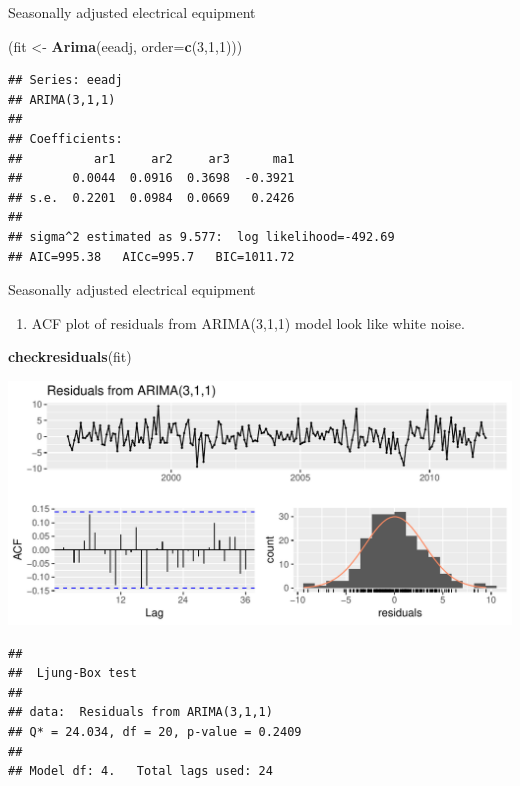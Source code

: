 \documentclass[14pt,ignorenonframetext,]{beamer}
\newenvironment{Shaded}{\begin{snugshade}}{\end{snugshade}}
\newcommand{\KeywordTok}[1]{\textcolor[rgb]{0.13,0.29,0.53}{\textbf{#1}}}
\newcommand{\DataTypeTok}[1]{\textcolor[rgb]{0.13,0.29,0.53}{#1}}
\newcommand{\DecValTok}[1]{\textcolor[rgb]{0.00,0.00,0.81}{#1}}
\newcommand{\StringTok}[1]{\textcolor[rgb]{0.31,0.60,0.02}{#1}}
\newcommand{\NormalTok}[1]{#1}
\providecommand{\tightlist}{%
  \setlength{\itemsep}{0pt}\setlength{\parskip}{0pt}}
\begin{document}
\begin{frame}[fragile]{\large Seasonally adjusted electrical equipment}

\fontsize{10}{10}\sf

\begin{Shaded}
\begin{Highlighting}[]
\NormalTok{(fit <-}\StringTok{ }\KeywordTok{Arima}\NormalTok{(eeadj, }\DataTypeTok{order=}\KeywordTok{c}\NormalTok{(}\DecValTok{3}\NormalTok{,}\DecValTok{1}\NormalTok{,}\DecValTok{1}\NormalTok{)))}
\end{Highlighting}
\end{Shaded}

\begin{verbatim}
## Series: eeadj 
## ARIMA(3,1,1) 
## 
## Coefficients:
##          ar1     ar2     ar3      ma1
##       0.0044  0.0916  0.3698  -0.3921
## s.e.  0.2201  0.0984  0.0669   0.2426
## 
## sigma^2 estimated as 9.577:  log likelihood=-492.69
## AIC=995.38   AICc=995.7   BIC=1011.72
\end{verbatim}

\end{frame}

\begin{frame}[fragile]{\large Seasonally adjusted electrical equipment}

\begin{enumerate}
\def\labelenumi{\arabic{enumi}.}
\setcounter{enumi}{5}
\tightlist
\item
  ACF plot of residuals from ARIMA(3,1,1) model look like white noise.
\end{enumerate}

\fontsize{11}{11}\sf

\begin{Shaded}
\begin{Highlighting}[]
\KeywordTok{checkresiduals}\NormalTok{(fit)}
\end{Highlighting}
\end{Shaded}

\includegraphics{week_5_arima_files/figure-beamer/unnamed-chunk-39-1.pdf}

\begin{verbatim}
## 
##  Ljung-Box test
## 
## data:  Residuals from ARIMA(3,1,1)
## Q* = 24.034, df = 20, p-value = 0.2409
## 
## Model df: 4.   Total lags used: 24
\end{verbatim}

\end{frame}
\end{document}
